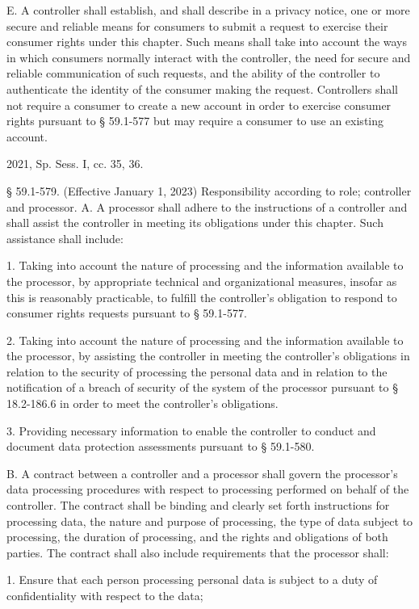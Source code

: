 E. A controller shall establish, and shall describe in a privacy notice, one or more secure and reliable means for consumers to submit a request to exercise their consumer rights under this chapter. Such means shall take into account the ways in which consumers normally interact with the controller, the need for secure and reliable communication of such requests, and the ability of the controller to authenticate the identity of the consumer making the request. Controllers shall not require a consumer to create a new account in order to exercise consumer rights pursuant to § 59.1-577 but may require a consumer to use an existing account.

2021, Sp. Sess. I, cc. 35, 36.

§ 59.1-579. (Effective January 1, 2023) Responsibility according to role; controller and processor.
A. A processor shall adhere to the instructions of a controller and shall assist the controller in meeting its obligations under this chapter. Such assistance shall include:

1. Taking into account the nature of processing and the information available to the processor, by appropriate technical and organizational measures, insofar as this is reasonably practicable, to fulfill the controller's obligation to respond to consumer rights requests pursuant to § 59.1-577.

2. Taking into account the nature of processing and the information available to the processor, by assisting the controller in meeting the controller's obligations in relation to the security of processing the personal data and in relation to the notification of a breach of security of the system of the processor pursuant to § 18.2-186.6 in order to meet the controller's obligations.

3. Providing necessary information to enable the controller to conduct and document data protection assessments pursuant to § 59.1-580.

B. A contract between a controller and a processor shall govern the processor's data processing procedures with respect to processing performed on behalf of the controller. The contract shall be binding and clearly set forth instructions for processing data, the nature and purpose of processing, the type of data subject to processing, the duration of processing, and the rights and obligations of both parties. The contract shall also include requirements that the processor shall:

1. Ensure that each person processing personal data is subject to a duty of confidentiality with respect to the data;

